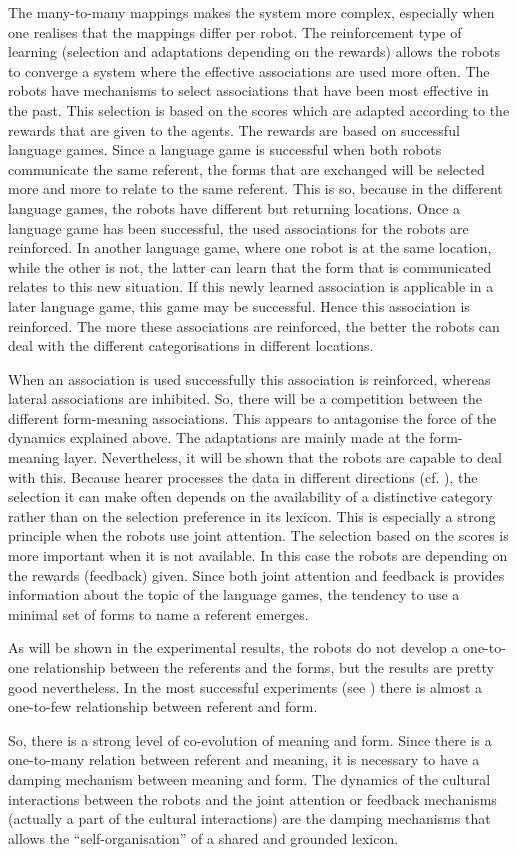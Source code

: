 The many-to-many mappings makes the system more complex, especially when one realises that the mappings differ per robot. The reinforcement type of learning (selection and adaptations depending on the rewards) allows the robots to converge a system where the effective associations are used more often. The robots have mechanisms to select associations that have been most effective in the past. This selection is based on the scores which are adapted according to the rewards that are given to the agents. The rewards are based on successful language games. Since a language game is successful when both robots communicate the same referent, the forms that are exchanged will be selected more and more to relate to the same referent. This is so, because in the different language games, the robots have different but returning locations. Once a language game has been successful, the used associations for the robots are reinforced. In another language game, where one robot is at the same location, while the other is not, the latter can learn that the form that is communicated relates to this new situation. If this newly learned association is applicable in a later language game, this game may be successful. Hence this association is reinforced. The more these associations are reinforced, the better the robots can deal with the different categorisations in different locations.

When an association is used successfully this association is reinforced, where\-as lateral associations are inhibited. So, there will be a competition between the different form-meaning associations. This appears to antagonise the force of the dynamics explained above. The adaptations are mainly made at the form-meaning layer. Nevertheless, it will be shown that the robots are capable to deal with this. Because hearer processes the data in different directions (cf. ), the selection it can make often depends on the availability of a distinctive category rather than on the selection preference in its lexicon. This is especially a strong principle when the robots use joint attention. The selection based on the scores is more important when it is not available. In this case the robots are depending on the rewards (feedback) given. Since both joint attention and feedback is provides information about the topic of the language games, the tendency to use a minimal set of forms to name a referent emerges.

As will be shown in the experimental results, the robots do not develop a one-to-one relationship between the referents and the forms, but the results are pretty good nevertheless. In the most successful experiments (see ) there is almost a one-to-few relationship between referent and form. 

So, there is a strong level of co-evolution of meaning and form. Since there is a one-to-many relation between referent and meaning, it is necessary to have a damping mechanism between meaning and form. The dynamics of the cultural interactions between the robots and the joint attention or feedback mechanisms (actually a part of the cultural interactions) are the damping mechanisms that allows the ``self-organisation'' of a shared and grounded lexicon.